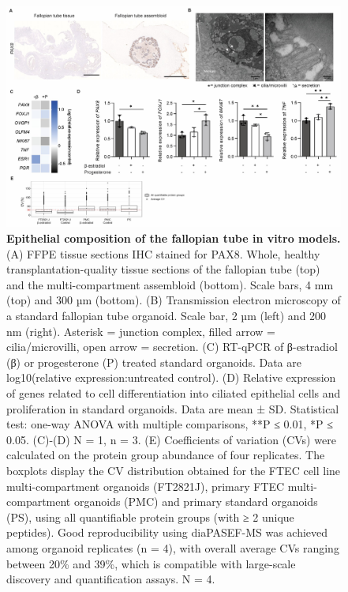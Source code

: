 \begin{refsection}
    \begin{figure}[p]
        \begin{center}
            \includegraphics[width=1\textwidth,height=0.85\textheight,keepaspectratio,clip,page=1]{figures/chapter4/fig_S3.jpg}
            \captionsetup{font=small}
            \caption{\textbf{Epithelial composition of the fallopian tube in vitro models.} (A) FFPE tissue sections IHC stained for PAX8. Whole, healthy transplantation-quality tissue sections of the fallopian tube (top) and the multi-compartment assembloid (bottom). Scale bars, 4 mm (top) and 300 µm (bottom). (B) Transmission electron microscopy of a standard fallopian tube organoid. Scale bar, 2 µm (left) and 200 nm (right). Asterisk = junction complex, filled arrow = cilia/microvilli, open arrow = secretion. (C) RT-qPCR of β-estradiol (β) or progesterone (P) treated standard organoids. Data are log10(relative expression:untreated control). (D) Relative expression of genes related to cell differentiation into ciliated epithelial cells and proliferation in standard organoids. Data are mean ± SD. Statistical test: one-way ANOVA with multiple comparisons, **P ≤ 0.01, *P ≤ 0.05.  (C)-(D) N = 1, n = 3. (E) Coefficients of variation (CVs) were calculated on the protein group abundance of four replicates. The boxplots display the CV distribution obtained for the FTEC cell line multi-compartment organoids (FT2821J), primary FTEC multi-compartment organoids (PMC) and primary standard organoids (PS), using all quantifiable protein groups (with ≥ 2 unique peptides). Good reproducibility using diaPASEF-MS was achieved among organoid replicates (n = 4), with overall average CVs ranging between 20\% and 39\%, which is compatible with large-scale discovery and quantification assays. N = 4.}
            \label{chapter4_figS3}
        \end{center}
    \end{figure}
    

\end{refsection}
